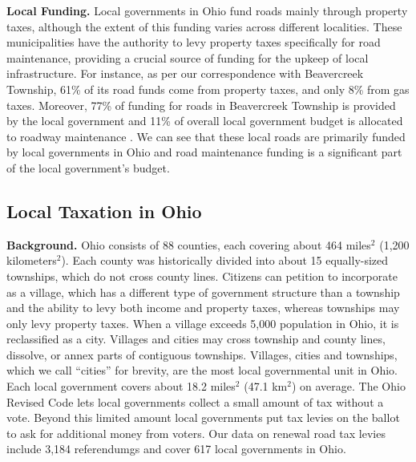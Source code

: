 {\bf Local Funding.} Local governments in Ohio fund roads mainly through property taxes, although the extent of this funding varies across different localities. These municipalities have the authority to levy property taxes specifically for road maintenance, providing a crucial source of funding for the upkeep of local infrastructure. For instance, as per our correspondence with Beavercreek Township, 61\% of its road funds come from property taxes, and only 8\% from gas taxes. Moreover, 77\% of funding for roads in Beavercreek Township is provided by the local government and 11\% of overall local government budget is allocated to roadway maintenance \citep{schroeder2025}. We can see that these local roads are primarily funded by local governments in Ohio and road maintenance funding is a significant part of the local government's budget.


\subsection{Local Taxation in Ohio}

{\bf Background.} Ohio consists of 88 counties, each covering about 464 miles$^2$ (1,200 kilometers$^2$). Each county was historically divided into about 15 equally-sized townships, which do not cross county lines. Citizens can petition to incorporate as a village, which has a different type of government structure than a township and the ability to levy both income and property taxes, whereas townships may only levy property taxes. When a village exceeds 5,000 population in Ohio, it is reclassified as a city. Villages and cities may cross township and county lines, dissolve, or annex parts of contiguous townships. Villages, cities and townships, which we call “cities” for brevity, are the most local governmental unit in Ohio. Each local government covers about 18.2 miles$^2$ (47.1 km$^2$) on average. The Ohio Revised Code lets local governments collect a small amount of tax without a vote. Beyond this limited amount local governments put tax levies on the ballot to ask for additional money from voters. Our data on renewal road tax levies include 3,184 referendumgs and cover 617 local governments in Ohio.


